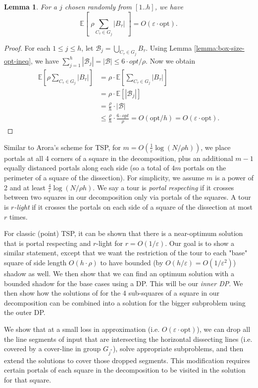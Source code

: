 \documentclass[pdflatex,sn-mathphys-num]{sn-jnl}
\theoremstyle{thmstyleone}
\newtheorem{lemma}{Lemma}
\newcommand{\eps}{\varepsilon}
\newcommand{\opt}{{\text{opt}}}
\newcommand{\abs}[1]{\left.|#1|\right.}
\newcommand{\E}{\mathbb{E}}
\begin{document}
\begin{lemma}\label{lem:cover-line-group}
    For a $j$ chosen randomly from $[1..h]$, we have 
    \[
        \E[\; \rho\sum_{C_\tau\in G_j}|B_\tau|\; ]=O(\eps\cdot\opt).
    \]
\end{lemma}
\begin{proof}
    For each $1 \le j \le h$, let $\mathcal B_j = \bigcup_{C_\tau\in G_j}{B_\tau}$. Using Lemma \ref{lemma:box-size-opt-ineq}, we have $\sum_{j = 1}^h \abs{\mathcal B_j} = \abs{\mathcal B} \le 6\cdot opt / \rho$. Now we obtain
    \begin{align*}
        \E[\rho \sum_{C_\tau\in G_j}\abs{B_\tau}] &= \rho\cdot \E[\sum_{C_\tau\in G_j}\abs{B_\tau}]\\
        &= \rho \cdot \E[\abs{\mathcal B_j}] \\
        &= \frac{\rho}{h}\cdot|\mathcal B|\\
        &\le \frac{\rho}{h} \cdot \frac{6\cdot opt}{\rho}  = O(\opt/h) = O(\eps\cdot \opt).
    \end{align*}
\end{proof}


Similar to Arora's scheme for TSP, for $m=O(\frac{1}{\eps}\log(N/\rho h))$, we place portals at all 4 corners of a square in the decomposition, plus an additional $m - 1$ equally distanced portals along each side (so a total of $4m$ portals on the perimeter of a square of the dissection). For simplicity, we assume $m$ is a power of 2 and at least $\frac{4}{\eps}\log(N/\rho h)$.
We say a tour is {\em portal respecting} if it crosses between two squares in our decomposition only via portals of the squares. A tour is {\em $r$-light} if it crosses the portals on each side of a square of the dissection at most $r$ times.

For classic (point) TSP, it can be shown that there is a near-optimum solution that is portal respecting and $r$-light for $r=O(1/\eps)$. Our goal is to
show a similar statement, except that we want the restriction of the tour to each "base" square of side length $O(h\cdot\rho)$ to have bounded (by $O(h/\eps)=O(1/\eps^2)$) shadow as well. We then show that we can find an optimum solution with a bounded shadow for the base cases using a DP. This will be our {\em inner DP}. We then show how the solutions of for the 4 sub-squares of a square in our decomposition can be combined into a solution for the bigger subproblem using the outer DP.

We show that at a small loss in approximation (i.e. $O(\eps\cdot\opt)$), we can drop all the line segments of input that are intersecting the horizontal dissecting lines (i.e. covered by a cover-line in group $G_{j^*}$), solve appropriate subproblems, and then extend the solutions to cover those dropped segments. This modification requires certain portals of each square in the decomposition to be visited in the solution for that square.
\end{document}
